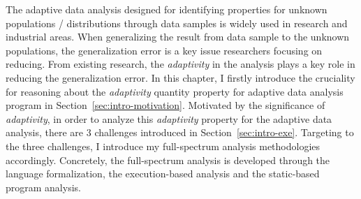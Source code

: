 The adaptive data analysis designed for identifying  properties for unknown populations / distributions 
through data samples is widely 
used in research and industrial areas.
When generalizing the result from data sample to the unknown populations, 
the generalization error is a key issue researchers focusing on reducing.
From existing research, the \emph{adaptivity} in the analysis plays a key role in reducing the generalization error.
In this chapter, 
I firstly introduce the  cruciality for reasoning about the \emph{adaptivity} quantity property 
for adaptive data analysis program in Section~\ref{sec:intro-motivation}.
Motivated by the significance of \emph{adaptivity},
in order to analyze this \emph{adaptivity} property for the adaptive data analysis, there are 3 challenges
introduced in Section~\ref{sec:intro-exe}.
Targeting to the three challenges, I introduce my full-spectrum analysis methodologies accordingly.
Concretely, the full-spectrum analysis is developed through the language formalization,
the execution-based analysis and the static-based program analysis.
  






